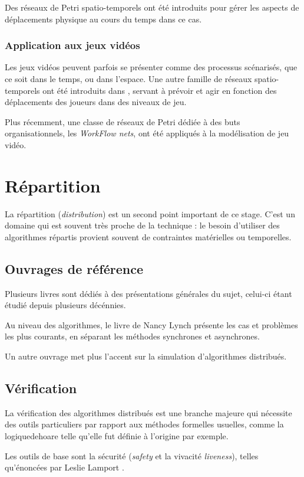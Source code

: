 Des réseaux de Petri spatio-temporels ont été introduits\cite{zhang2014modeling} pour gérer les aspects de déplacements physique au cours du temps dans ce cas.

\subsubsection{Application aux jeux vidéos}
Les jeux vidéos peuvent parfois se présenter comme des processus scénarisés, que ce soit dans le temps, ou dans l'espace.
Une autre famille de réseaux spatio-temporels ont été introduits dans \cite{natkin2004new}, servant à prévoir et agir en fonction des déplacements des joueurs dans des niveaux de jeu.

Plus récemment, une classe de réseaux de Petri dédiée à des buts organisationnels, les \textit{WorkFlow nets}\cite{oliveira2011game}, ont été appliqués à la modélisation de jeu vidéo.
\section{Répartition}
La répartition (\textit{distribution}) est un second point important de ce stage. C'est un domaine qui est souvent très proche de la technique : le besoin d'utiliser des algorithmes répartis provient souvent de contraintes matérielles ou temporelles.

\subsection{Ouvrages de référence}
Plusieurs livres sont dédiés à des présentations générales du sujet, celui-ci étant étudié depuis plusieurs décénnies.

Au niveau des algorithmes, le livre de Nancy Lynch \cite{lynch1996distributed} présente les cas et problèmes les plus courants, en séparant les méthodes synchrones et asynchrones. 

Un autre ouvrage \cite{attiya2004distributed} met plus l'accent sur la simulation d'algorithmes distribués.

\subsection{Vérification}
La vérification des algorithmes distribués est une branche majeure qui nécessite des outils particuliers par rapport aux méthodes formelles usuelles, comme la \gls{logiquedehoare} telle qu'elle fut définie à l'origine par exemple.

Les outils de base sont la sécurité (\textit{safety} et la vivacité \textit{liveness}), telles qu'énoncées par Leslie Lamport \cite{lamport1977proving}.

